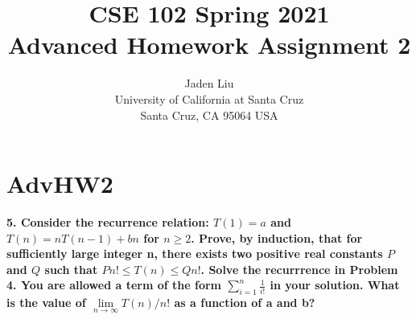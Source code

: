 \documentclass[12pt]{article}
\begin{document}
\title{ CSE 102 Spring 2021\\
	Advanced Homework Assignment 2}

\author{Jaden Liu \\ 
University of California at Santa Cruz\\
Santa Cruz, CA 95064 USA }

\maketitle


\section{AdvHW2} 

\textbf{5. Consider the recurrence relation: $T(1)=a$ and $T(n)=nT(n-1)+bn$
	for $n\ge2$. Prove, by induction, that for sufficiently large integer n, there
	exists two positive real constants $P$ and $Q$ such that $Pn!\le T(n)\le Qn!$. Solve the recurrrence in Problem 4. You are allowed a term  of the form $\sum_{i=1}^{n}\frac{1}{i!}$ in your solution. What is the value of $\lim\limits_{n\to\infty}T(n)/n!$ as a function of a and b?}\\
\end{document}
